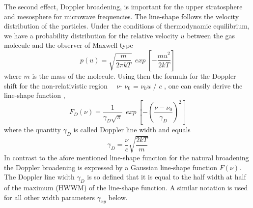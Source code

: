 The second effect, Doppler broadening, is important for the upper
stratosphere and mesosphere for microwave frequencies. The line-shape
follows the velocity distribution of the particles. Under the conditions
of thermodynamic equilibrium, we have  a probability distribution for
the relative velocity $u$ between the gas molecule and the observer 
of Maxwell type 
\begin{equation}\label{maxwell_distribution}
  p(u)=\sqrt{\frac{m}{2\pi kT}}~~exp~\left[-\frac{mu^2}{2kT}\right]
\end{equation}
where $m$ is the mass of the molecule. Using then the formula for the
Doppler shift for the non-relativistic region~~  $\nu$- $\nu_0$ =
$\nu_0$$u$ / $c$ , one can easily derive the line-shape function \citep{bernath:95}, 
\begin{equation}
 F_D(\nu)=\frac{1}{\gamma_D\sqrt{\pi}}~~exp~\left[-\left(\frac{\nu - \nu_0}{\gamma_D}\right)^2\right]
\end{equation}
where the quantity $\gamma_D$ is called Doppler line width and equals
\begin{equation}
 \gamma_D=\frac{\nu}{c}\sqrt{\frac{2kT}{m}}
\end{equation}
In contrast to the afore mentioned line-shape function for the natural
broadening the Doppler broadening is expressed by a Gaussian
line-shape function $F(\nu)$. The Doppler line width $\gamma_D$ is so
defined that it is equal to the half width at half of the maximum
(HWWM) of the line-shape function. A similar notation is used
for all other width parameters $\gamma_{xy}$ below.

